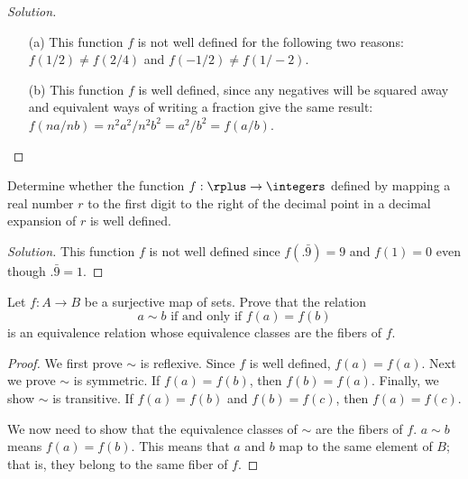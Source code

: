 \begin{proof}[Solution]
	\begin{enumerate}
		\item[(a)] This function $f$ is not well defined for the
			following two reasons: $f(1/2) \neq f(2/4)$ and $f(-1/2) \neq f(1/-2)$.
			
		\item[(b)] This function $f$ is well defined, since any
			negatives will be squared away and equivalent ways of writing a fraction give the same result: $f(na/nb) = n^2a^2/n^2b^2 = a^2/b^2 = f(a/b)$.
	\end{enumerate}
\end{proof}


\begin{exercise}
	Determine whether the function $f : \rplus \to \integers$ defined by mapping a real number $r$ to the first digit to the right of the decimal point in a decimal expansion of $r$ is well defined.
\end{exercise}

\begin{proof}[Solution]
	This function $f$ is not well defined since $f(.\bar{9}) = 9$ 
	and $f(1) = 0$ even though $.\bar{9} = 1$.
\end{proof}


\begin{exercise}
	Let $f : A \to B$ be a surjective map of sets. Prove that the relation
	\[
		a \sim b \text{ if and only if } f(a) = f(b)
	\]
	is an equivalence relation whose equivalence classes are the fibers of $f$.
\end{exercise}

\begin{proof}
	We first prove $\sim$ is reflexive. Since $f$ is well defined, $f(a) = f(a)$. Next we prove $\sim$ is symmetric. If $f(a) = f(b)$, then $f(b) = f(a)$. Finally, we show $\sim$ is transitive. If $f(a) = f(b)$ and $f(b) = f(c)$, then $f(a) = f(c)$.
	
	We now need to show that the equivalence classes of $\sim$ are the fibers of $f$. $a \sim b$ means $f(a) = f(b)$. This means that $a$ and $b$ map to the same element of $B$; that is, they belong to the same fiber of $f$.
\end{proof}


